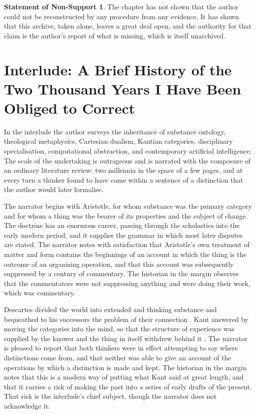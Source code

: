 \documentclass[11pt,openany,twoside]{book}
\theoremstyle{plain}
\theoremstyle{definition}
\newtheorem{nonsupport}{Statement of Non-Support}
\theoremstyle{remark}
\begin{document}
\begin{nonsupport}
The chapter has not shown that the author could not be reconstructed by any procedure from any evidence. It has shown that this archive, taken alone, leaves a great deal open, and the authority for that claim is the author's report of what is missing, which is itself unarchived.
\end{nonsupport}

\chapter*{Interlude: A Brief History of the Two Thousand Years I Have Been Obliged to Correct}

In the interlude the author surveys the inheritance of substance ontology, theological metaphysics, Cartesian dualism, Kantian categories, disciplinary specialisation, computational abstraction, and contemporary artificial intelligence. The scale of the undertaking is outrageous and is narrated with the composure of an ordinary literature review: two millennia in the space of a few pages, and at every turn a thinker found to have come within a sentence of a distinction that the author would later formalise.

The narrator begins with Aristotle, for whom substance was the primary category and for whom a thing was the bearer of its properties and the subject of change. The doctrine has an enormous career, passing through the scholastics into the early modern period, and it supplies the grammar in which most later disputes are stated. The narrator notes with satisfaction that Aristotle's own treatment of matter and form contains the beginnings of an account in which the thing is the outcome of an organising operation, and that this account was subsequently suppressed by a century of commentary. The historian in the margin observes that the commentators were not suppressing anything and were doing their work, which was commentary.

Descartes divided the world into extended and thinking substance and bequeathed to his successors the problem of their connection \cite{descartes-meditations}. Kant answered by moving the categories into the mind, so that the structure of experience was supplied by the knower and the thing in itself withdrew behind it \cite{kant-critique}. The narrator is pleased to report that both thinkers were in effect attempting to say where distinctions come from, and that neither was able to give an account of the operations by which a distinction is made and kept. The historian in the margin notes that this is a modern way of putting what Kant said at great length, and that it carries a risk of making the past into a series of early drafts of the present. That risk is the interlude's chief subject, though the narrator does not acknowledge it.
\end{document}

